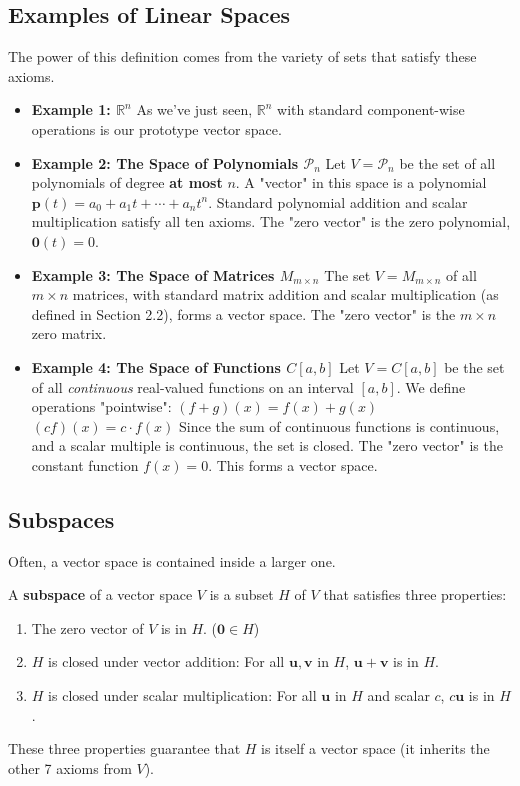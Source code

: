 \documentclass[oneside]{book}
\begin{document}
\subsection{Examples of Linear Spaces}
The power of this definition comes from the variety of sets that satisfy these axioms.
\begin{itemize}
    \item \textbf{Example 1: $\mathbb{R}^n$}
    As we've just seen, $\mathbb{R}^n$ with standard component-wise operations is our prototype vector space.
    
    \item \textbf{Example 2: The Space of Polynomials $\mathcal{P}_n$}
    Let $V = \mathcal{P}_n$ be the set of all polynomials of degree \textbf{at most} $n$. A "vector" in this space is a polynomial $\mathbf{p}(t) = a_0 + a_1t + \cdots + a_nt^n$.
    Standard polynomial addition and scalar multiplication satisfy all ten axioms. The "zero vector" is the zero polynomial, $\mathbf{0}(t) = 0$.
    
    \item \textbf{Example 3: The Space of Matrices $M_{m \times n}$}
    The set $V = M_{m \times n}$ of all $m \times n$ matrices, with standard matrix addition and scalar multiplication (as defined in Section 2.2), forms a vector space. The "zero vector" is the $m \times n$ zero matrix.
    
    \item \textbf{Example 4: The Space of Functions $C[a, b]$}
    Let $V = C[a, b]$ be the set of all \emph{continuous} real-valued functions on an interval $[a, b]$.
    We define operations "pointwise":
    $(f+g)(x) = f(x) + g(x)$
    $(cf)(x) = c \cdot f(x)$
    Since the sum of continuous functions is continuous, and a scalar multiple is continuous, the set is closed. The "zero vector" is the constant function $f(x) = 0$. This forms a vector space.
\end{itemize}

\subsection{Subspaces}
Often, a vector space is contained inside a larger one.

\begin{definition}
A \textbf{subspace} of a vector space $V$ is a subset $H$ of $V$ that satisfies three properties:
\begin{enumerate}
    \item The zero vector of $V$ is in $H$. ($\mathbf{0} \in H$)
    \item $H$ is closed under vector addition: For all $\mathbf{u}, \mathbf{v}$ in $H$, $\mathbf{u} + \mathbf{v}$ is in $H$.
    \item $H$ is closed under scalar multiplication: For all $\mathbf{u}$ in $H$ and scalar $c$, $c\mathbf{u}$ is in $H$.
\end{enumerate}
These three properties guarantee that $H$ is itself a vector space (it inherits the other 7 axioms from $V$).
\end{definition}
\end{document}
